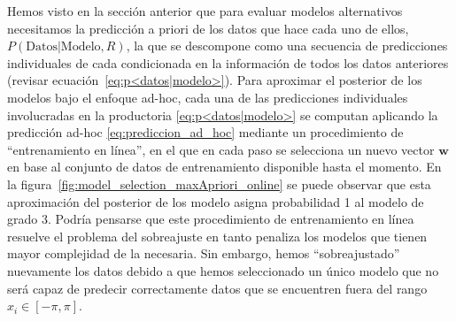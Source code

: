 \documentclass[a4paper,11pt]{book}
\theoremstyle{definition}
\begin{document}
Hemos visto en la secci\'on anterior que para evaluar modelos alternativos necesitamos la predicci\'on a priori de los datos que hace cada uno de ellos, $P(\text{Datos}|\text{Modelo}, R)$, la que se descompone como una secuencia de predicciones individuales de cada condicionada en la informaci\'on de todos los datos anteriores (revisar ecuaci\'on~\ref{eq:p<datos|modelo>}).
%
Para aproximar el posterior de los modelos bajo el enfoque ad-hoc, cada una de las predicciones individuales involucradas en la productoria \eqref{eq:p<datos|modelo>} se computan aplicando la predicci\'on ad-hoc \ref{eq:prediccion_ad_hoc} mediante un procedimiento de ``entrenamiento en l\'inea'', en el que en cada paso se selecciona un nuevo vector $\bm{w}$ en base al conjunto de datos de entrenamiento disponible hasta el momento.
%
En la figura~\ref{fig:model_selection_maxApriori_online} se puede observar que esta aproximaci\'on del posterior de los modelo asigna probabilidad 1 al modelo de grado 3.
%
Podr\'ia pensarse que este procedimiento de entrenamiento en l\'inea resuelve el problema del sobreajuste en tanto penaliza los modelos que tienen mayor complejidad de la necesaria.
%
Sin embargo, hemos ``sobreajustado'' nuevamente los datos debido a que hemos seleccionado un \'unico modelo que no ser\'a capaz de predecir correctamente datos que se encuentren fuera del rango $x_i \in [-\pi, \pi]$.
%
\end{document}
